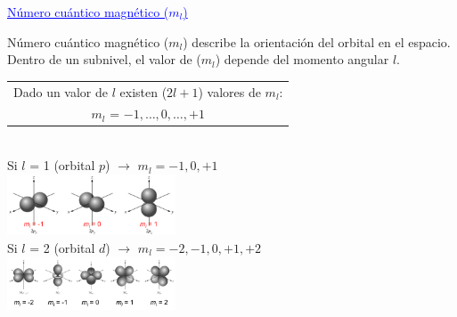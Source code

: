         \begin{center} \textcolor{blue}{\underline{Número cuántico magnético ($m_l$)}} \end{center}
            \sangria Número cuántico magnético ($m_l$) describe la orientación del orbital en el espacio. Dentro de un subnivel, el valor de ($m_l$) depende del momento angular $l$.
            \begin{center} 
                \begin{tabular}{| c |}
                    \hline
                    Dado un valor de $l$ existen ($2l + 1$) valores de $m_l$: \\
                    $m_l$ = $-1, \dots, 0, \dots, +1$ \\
                    \hline
                \end{tabular} \\[10pt]
                Si $l$ = 1 (orbital $p$) $\rightarrow$ $m_l = -1, 0, +1$ \\
                \includegraphics[width=5cm] {./imagenes/magneticoOrbitalP.png} \\
                Si $l$ = 2 (orbital $d$) $\rightarrow$ $m_l = -2, -1, 0 , +1 , +2$ \\
                \includegraphics[width=5cm]{./imagenes/magneticoOrbitalD.png}
            \end{center}

